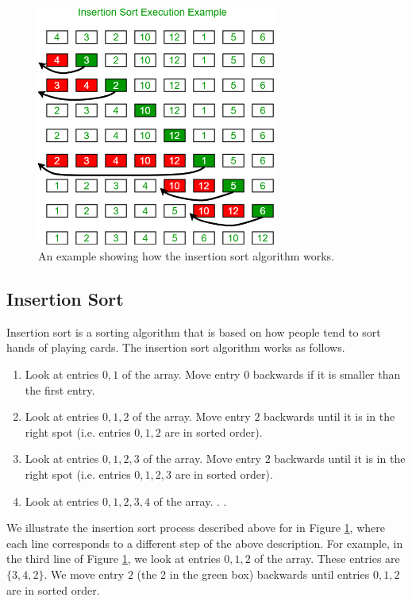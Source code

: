  \begin{figure}
    \centering
    \includegraphics[width=0.7\textwidth]{images/insertionsort.png}
    \caption{An example showing how the insertion sort algorithm works.}
    \label{fig:insertion_sort}
\end{figure}


\subsection{Insertion Sort}

Insertion sort is a sorting algorithm that is based on how people tend to sort hands of playing cards. The insertion sort algorithm works as follows.
\begin{enumerate}
 \item Look at entries $0, 1$ of the array. Move entry $0$ backwards if it is smaller than the first entry.
 \item Look at entries $0, 1, 2$ of the array. Move entry $2$ backwards until it is in the right spot (i.e. entries $0,1,2$ are in sorted order).
 \item Look at entries $0, 1, 2, 3$ of the array. Move entry $2$ backwards until it is in the right spot (i.e. entries $0,1,2, 3$ are in sorted order).
 \item Look at entries $0, 1, 2, 3, 4$ of the array. . .
\end{enumerate}
 
We illustrate the insertion sort process described above for  in Figure \ref{fig:insertion_sort}, where each line corresponds to a different step of the above description. For example, in the third line of Figure \ref{fig:insertion_sort}, we look at entries $0, 1, 2$ of the array. These entries are $\{3, 4, 2\}$. We move entry $2$ (the 2 in the green box) backwards until entries $0, 1, 2$ are in sorted order. 

